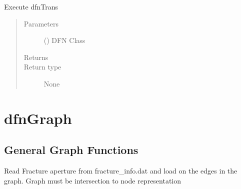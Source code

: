 \documentclass[letterpaper,10pt,english]{sphinxmanual}
\begin{document}

\begin{fulllineitems}
\label{\detokenize{pydfnworks:pydfnworks.dfnTrans.transport.run_dfn_trans}}
Execute dfnTrans
\begin{quote}\begin{description}
\item[{Parameters}] \leavevmode
{} () \textendash{} DFN Class

\item[{Returns}] \leavevmode


\item[{Return type}] \leavevmode
None

\end{description}\end{quote}

\end{fulllineitems}



\section{dfnGraph}
\label{\detokenize{pydfnworks:dfngraph}}

\subsection{General Graph Functions}
\label{\detokenize{pydfnworks:module-pydfnworks.dfnGraph.dfn2graph}}\label{\detokenize{pydfnworks:general-graph-functions}}

\begin{fulllineitems}
\label{\detokenize{pydfnworks:pydfnworks.dfnGraph.dfn2graph.add_area}}
Read Fracture aperture from fracture\_info.dat and
load on the edges in the graph. Graph must be intersection to node
representation

\end{fulllineitems}
\end{document}
